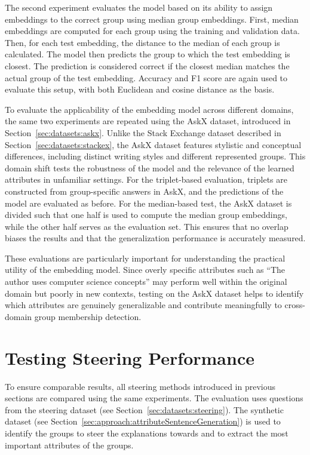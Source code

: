 The second experiment evaluates the model based on its ability to assign embeddings to the correct group using median group embeddings. First, median embeddings are computed for each group using the training and validation data. Then, for each test embedding, the distance to the median of each group is calculated. The model then predicts the group to which the test embedding is closest. The prediction is considered correct if the closest median matches the actual group of the test embedding. Accuracy and F1 score are again used to evaluate this setup, with both Euclidean and cosine distance as the basis.

To evaluate the applicability of the embedding model across different domains, the same two experiments are repeated using the AskX dataset, introduced in Section~\ref{sec:datasets:askx}. Unlike the Stack Exchange dataset described in Section~\ref{sec:datasets:stackex}, the AskX dataset features stylistic and conceptual differences, including distinct writing styles and different represented groups. This domain shift tests the robustness of the model and the relevance of the learned attributes in unfamiliar settings. For the triplet-based evaluation, triplets are constructed from group-specific answers in AskX, and the predictions of the model are evaluated as before. For the median-based test, the AskX dataset is divided such that one half is used to compute the median group embeddings, while the other half serves as the evaluation set. This ensures that no overlap biases the results and that the generalization performance is accurately measured.

These evaluations are particularly important for understanding the practical utility of the embedding model. Since overly specific attributes such as \enquote{The author uses computer science concepts} may perform well within the original domain but poorly in new contexts, testing on the AskX dataset helps to identify which attributes are genuinely generalizable and contribute meaningfully to cross-domain group membership detection.


\section{Testing Steering Performance}
\label{sec:experiments:steering}
To ensure comparable results, all steering methods introduced in previous sections are compared using the same experiments. The evaluation uses questions from the steering dataset (see Section~\ref{sec:datasets:steering}). The synthetic dataset (see Section~\ref{sec:approach:attributeSentenceGeneration}) is used to identify the groups to steer the explanations towards and to extract the most important attributes of the groups.

